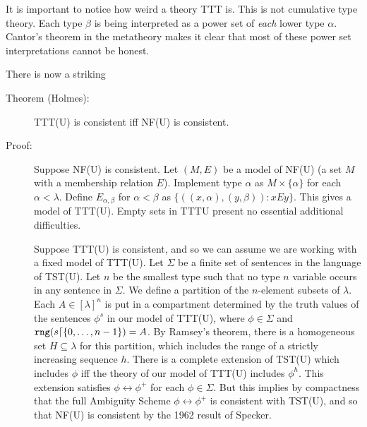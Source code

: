 \documentclass[112pt]{article}
\begin{document}
It is important to notice how weird a theory TTT is.  This is not cumulative type theory.  Each type $\beta$ is being interpreted as a power set of {\em each\/} lower type $\alpha$.  Cantor's theorem in the metatheory makes it clear that most of these power set interpretations cannot be honest.

There is now a striking

\begin{description}

\item[Theorem (Holmes):]  TTT(U) is consistent iff NF(U) is consistent.

\item[Proof:]  Suppose NF(U) is consistent.  Let $(M,E)$ be a model of NF(U) (a set $M$ with a membership relation $E$).  Implement type $\alpha$ as $M \times \{\alpha\}$ for
each $\alpha<\lambda$.  Define $E_{\alpha,\beta}$ for $\alpha<\beta$ as $\{((x,\alpha),(y,\beta)):xEy\}$.  This gives a model of TTT(U).   Empty sets in TTTU present no essential additional difficulties.

Suppose TTT(U) is consistent, and so we can assume we are working with a fixed model of TTT(U).  Let $\Sigma$ be a finite set of sentences in the language of TST(U).  Let $n$ be the smallest type such that no type $n$ variable occurs in any sentence in $\Sigma$.  We define a partition of the $n$-element subsets of $\lambda$.  Each $A \in [\lambda]^n$ is put in a compartment
determined by the truth values of the sentences $\phi^s$ in our model of TTT(U), where $\phi \in \Sigma$ and ${\tt rng}(s \lceil \{0,\ldots,n-1\}) = A$.  By Ramsey's theorem, there is a homogeneous set $H \subseteq \lambda$ for this partition, which includes the range of a strictly increasing sequence $h$.  There is a complete extension of TST(U) which includes
$\phi$ iff the theory of our model of TTT(U) includes $\phi^h$.  This extension satisfies $\phi \leftrightarrow \phi^+$ for each $\phi \in \Sigma$.  But this implies by compactness that the full Ambiguity Scheme $\phi \leftrightarrow \phi^+$ is consistent with TST(U), and so that NF(U) is consistent by the 1962 result of Specker.


\end{description}
\end{document}
